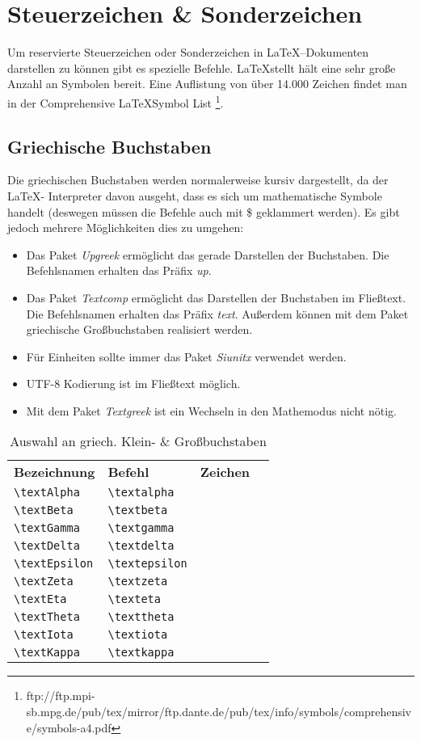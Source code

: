 \chapter{Steuerzeichen \& Sonderzeichen}
Um reservierte Steuerzeichen oder Sonderzeichen in \LaTeX--Dokumenten darstellen zu können gibt es spezielle Befehle. \LaTeX stellt hält eine sehr große Anzahl an Symbolen bereit. Eine Auflistung von über 14.000 Zeichen findet man in der Comprehensive \LaTeX Symbol List \footnote{ftp://ftp.mpi-sb.mpg.de/pub/tex/mirror/ftp.dante.de/pub/tex/info/symbols/comprehensive/symbols-a4.pdf}.
\section{Griechische Buchstaben}
Die griechischen Buchstaben werden normalerweise kursiv dargestellt, da der \LaTeX- Interpreter davon ausgeht, dass es sich um mathematische Symbole handelt (deswegen müssen die Befehle auch mit \$ geklammert werden). Es gibt jedoch mehrere Möglichkeiten dies zu umgehen:
\begin{itemize}
\item Das Paket \textsl{Upgreek} ermöglicht das gerade Darstellen der Buchstaben. Die Befehlsnamen erhalten das Präfix \textsl{up}.
\item Das Paket \textsl{Textcomp} ermöglicht das Darstellen der Buchstaben im Fließtext. Die Befehlsnamen erhalten das Präfix \textsl{text}. Außerdem können mit dem Paket griechische Großbuchstaben realisiert werden.
\item Für Einheiten sollte immer das Paket \textsl{Siunitx} verwendet werden.
\item UTF-8 Kodierung ist im Fließtext möglich.
\item Mit dem Paket \textsl{Textgreek} ist ein Wechseln in den Mathemodus nicht nötig.
\end{itemize}
\setlength{\tabcolsep}{1cm}
\begin{table}[H]
\begin{tabular}{l l l c}
\textbf{Bezeichnung}		&\textbf{Befehl}		&\textbf{Zeichen}\\
\verb=\textAlpha=		&\verb=\textalpha=	&\textalpha\\
\verb=\textBeta=		&\verb=\textbeta=	&\textbeta\\
\verb=\textGamma=		&\verb=\textgamma=	&\textgamma\\
\verb=\textDelta=		&\verb=\textdelta=	&\textdelta\\
\verb=\textEpsilon=		&\verb=\textepsilon=	&\textepsilon\\
\verb=\textZeta=		&\verb=\textzeta=	&\textzeta\\
\verb=\textEta=			&\verb=\texteta=	&\texteta\\
\verb=\textTheta=		&\verb=\texttheta=	&\texttheta\\
\verb=\textIota=			&\verb=\textiota=	&\textiota\\
\verb=\textKappa=		&\verb=\textkappa=	&\textkappa\\
\end{tabular}
\caption{Auswahl an griech. Klein- \& Großbuchstaben}
\end{table}
